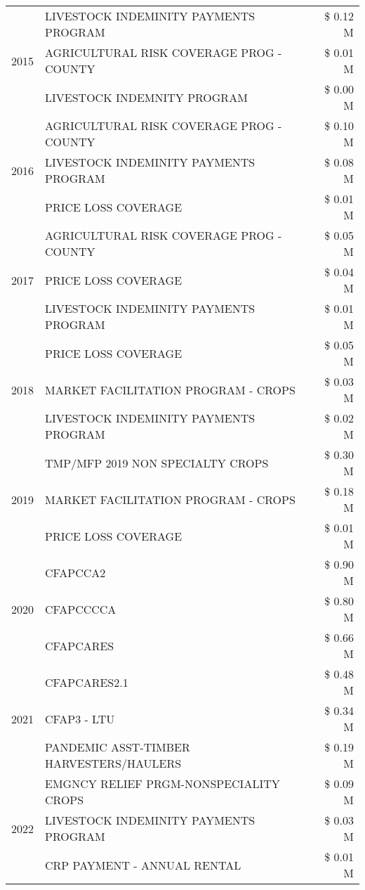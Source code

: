 \begin{tabular}{llr}
\cline{1-3}
\multirow[t]{3}{*}{2015} & LIVESTOCK INDEMINITY PAYMENTS PROGRAM & \$ 0.12 M \\
 & AGRICULTURAL RISK COVERAGE PROG - COUNTY & \$ 0.01 M \\
 & LIVESTOCK INDEMNITY PROGRAM & \$ 0.00 M \\
\cline{1-3}
\multirow[t]{3}{*}{2016} & AGRICULTURAL RISK COVERAGE PROG - COUNTY & \$ 0.10 M \\
 & LIVESTOCK INDEMINITY PAYMENTS PROGRAM & \$ 0.08 M \\
 & PRICE LOSS COVERAGE & \$ 0.01 M \\
\cline{1-3}
\multirow[t]{3}{*}{2017} & AGRICULTURAL RISK COVERAGE PROG - COUNTY & \$ 0.05 M \\
 & PRICE LOSS COVERAGE & \$ 0.04 M \\
 & LIVESTOCK INDEMINITY PAYMENTS PROGRAM & \$ 0.01 M \\
\cline{1-3}
\multirow[t]{3}{*}{2018} & PRICE LOSS COVERAGE & \$ 0.05 M \\
 & MARKET FACILITATION PROGRAM - CROPS & \$ 0.03 M \\
 & LIVESTOCK INDEMINITY PAYMENTS PROGRAM & \$ 0.02 M \\
\cline{1-3}
\multirow[t]{3}{*}{2019} & TMP/MFP 2019 NON SPECIALTY CROPS & \$ 0.30 M \\
 & MARKET FACILITATION PROGRAM - CROPS & \$ 0.18 M \\
 & PRICE LOSS COVERAGE & \$ 0.01 M \\
\cline{1-3}
\multirow[t]{3}{*}{2020} & CFAPCCA2 & \$ 0.90 M \\
 & CFAPCCCCA & \$ 0.80 M \\
 & CFAPCARES & \$ 0.66 M \\
\cline{1-3}
\multirow[t]{3}{*}{2021} & CFAPCARES2.1 & \$ 0.48 M \\
 & CFAP3 - LTU & \$ 0.34 M \\
 & PANDEMIC ASST-TIMBER HARVESTERS/HAULERS & \$ 0.19 M \\
\cline{1-3}
\multirow[t]{3}{*}{2022} & EMGNCY RELIEF PRGM-NONSPECIALITY CROPS & \$ 0.09 M \\
 & LIVESTOCK INDEMINITY PAYMENTS PROGRAM & \$ 0.03 M \\
 & CRP PAYMENT - ANNUAL RENTAL & \$ 0.01 M \\
\cline{1-3}
\bottomrule
\end{tabular}
